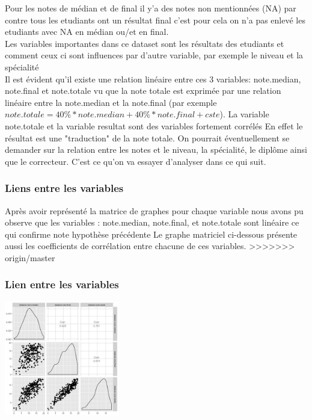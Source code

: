 \documentclass[10pt]{article}
\begin{document}
Pour les notes de médian et de final il y'a des notes non mentionnées (NA) par contre tous les etudiants ont un résultat final c'est pour cela on n'a pas enlevé les etudiants avec NA en médian ou/et en final.\\
Les variables importantes dans ce dataset sont les résultats des etudiants et comment ceux ci sont influences par d'autre variable, par exemple le niveau et la spécialité\\
Il est évident qu'il existe une relation linéaire entre ces 3 variables: note.median, note.final et note.totale vu que la note totale est exprimée par une relation linéaire entre la note.median et la note.final (par exemple $note.totale = 40\% * note.median + 40\% * note.final + cste$). La variable note.totale et la variable resultat sont des variables fortement corrélés En effet le résultat est une "traduction"  de la note totale. On pourrait éventuellement se demander sur la relation entre les notes et le niveau, la spécialité, le diplôme ainsi que le correcteur. C'est ce qu'on va essayer d'analyser dans ce qui suit. 


\subsubsection{Liens entre les variables}
Après avoir représenté la matrice de graphes pour chaque variable nous avons pu observe que les variables : note.median, note.final, et note.totale sont linéaire ce qui confirme note hypothèse précédente Le graphe matriciel ci-dessous présente aussi les coefficients de corrélation entre chacune de ces variables.
>>>>>>> origin/master

\subsubsection{Lien entre les variables}
	\begin{center}
	\includegraphics[width=50mm]{Figures/Notes/corr_notes.jpg}
	\label{fig:multiplot_notes}
\end{center}
\end{document}
